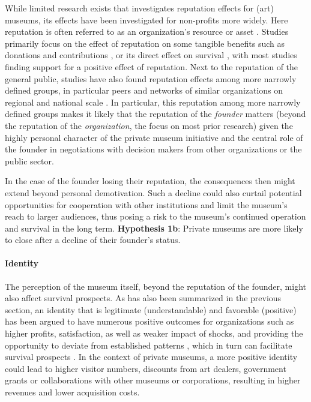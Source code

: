 \documentclass[12pt]{article}
\begin{document}
While limited research exists that investigates reputation effects for (art) museums, its effects have been investigated for non-profits more widely.
Here reputation is often referred to as an organization's resource or asset \parencite{Kong_Farrell_2010_image,Walker_McCarthy_2010_survival,Schloderer_Sarstedt_Ringle_2014_reputation}. 
Studies primarily focus on the effect of reputation on some tangible benefits such as donations and contributions \parencite{Sarstedt_2010_reputation,Mews_Boenigk_2012_blood,Heller_2008_alliances,Meijer_2009_reputation}, or its direct effect on survival \parencite{Lu_Shon_Zhang_2019_dissolution,Singh_1991_change,Hager_2001_vulnerability,Bielefeld_1994_survival,HernandezOrtiz_2022_discontinuity}, with most studies finding support for a positive effect of reputation.
Next to the reputation of the general public, studies have also found reputation effects among more narrowly defined groups, in particular peers \parencite{Padanyi_Gainer_2003_peerreputation} and networks of similar organizations on regional and national scale \parencite{Walker_McCarthy_2010_survival}.
In particular, this reputation among more narrowly defined groups makes it likely that the reputation of the \emph{founder} matters (beyond the reputation of the \emph{organization}, the focus on most prior research) given the highly personal character of the private museum initiative and the central role of the founder in negotiations with decision makers from other organizations or the public sector.


In the case of the founder losing their reputation, the consequences then might extend beyond personal demotivation.
Such a decline could also curtail potential opportunities for cooperation with other institutions and limit the museum's reach to larger audiences, thus posing a risk to the museum's continued operation and survival in the long term.
\bigbreak
\noindent
\textbf{Hypothesis 1b}: Private museums are more likely to close after a decline of their founder's status.




\paragraph*{Identity}

The perception of the museum itself, beyond the reputation of the founder, might also affect survival prospects.
As has also been summarized in the previous section, an identity that is legitimate (understandable) and favorable (positive) has been argued to have numerous positive outcomes for organizations such as higher profits, satisfaction, as well as weaker impact of shocks, and providing the opportunity to deviate from established patterns \parencite{Lange_Lee_Dai_2010_reputation}, which in turn can facilitate survival prospects \parencite{Rao_1994_reputation}.
In the context of private museums, a more positive identity could lead to higher visitor numbers, discounts from art dealers, government grants or collaborations with other museums or corporations, resulting in higher revenues and lower acquisition costs.
\end{document}
